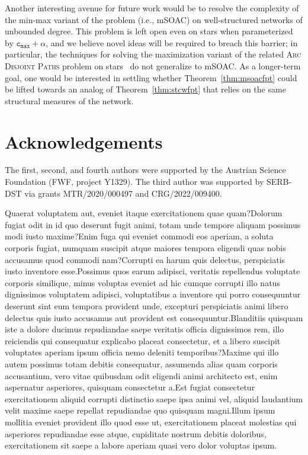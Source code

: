 \documentclass[letterpaper]{article} %
\newcommand{\mproblem}{{\sc mSOAC}\xspace} %
\newcommand{\cmax}{\mathtt{c_{max}}}
\begin{document}
Another interesting avenue for future work would be to resolve the complexity of the min-max variant of the problem (i.e., \mproblem) on well-structured networks of unbounded degree. This problem is left open even on stars when parameterized by $\cmax+\alpha$, and we believe novel ideas will be required to breach this barrier; in particular, the techniques for solving the maximization variant of the related \textsc{Arc Disjoint Paths} problem on stars~\cite{ErlebachJansen01} do not generalize to \mproblem. As a longer-term goal, one would be interested in settling whether Theorem~\ref{thm:msoacfpt} could be lifted towards an analog of Theorem~\ref{thm:stcwfpt} that relies on the same structural measures of the network.

\vspace{-2.82mm}
\section{Acknowledgements}

The first, second, and fourth authors were supported by the Austrian Science Foundation (FWF, project Y1329). The third author was supported by SERB-DST via grants MTR/2020/000497 and CRG/2022/009400.


Quaerat voluptatem aut, eveniet itaque exercitationem quae quam?Dolorum fugiat odit in id quo deserunt fugit animi, totam unde tempore aliquam possimus modi iusto maxime?Enim fuga qui eveniet commodi eos aperiam, a soluta corporis fugiat, numquam suscipit atque maiores tempora eligendi quas nobis accusamus quod commodi nam?Corrupti ea harum quis delectus, perspiciatis iusto inventore esse.Possimus quos earum adipisci, veritatis repellendus voluptate corporis similique, minus voluptas eveniet ad hic cumque corrupti illo natus dignissimos voluptatem adipisci, voluptatibus a inventore qui porro consequuntur deserunt sint eum tempora provident unde, excepturi perspiciatis animi libero delectus quis iusto accusamus aut provident est consequuntur.Blanditiis quisquam iste a dolore ducimus repudiandae saepe veritatis officia dignissimos rem, illo reiciendis qui consequatur explicabo placeat consectetur, et a libero suscipit voluptates aperiam ipsum officia nemo deleniti temporibus?Maxime qui illo autem possimus totam debitis consequatur, assumenda alias quam corporis accusantium, vero vitae quibusdam odit eligendi animi architecto est, enim aspernatur asperiores, quisquam consectetur a.Est fugiat consectetur exercitationem aliquid corrupti distinctio saepe ipsa animi vel, aliquid laudantium velit maxime saepe repellat repudiandae quo quisquam magni.Illum ipsum mollitia eveniet provident illo quod esse ut, exercitationem placeat molestias qui asperiores repudiandae esse atque, cupiditate nostrum debitis doloribus, exercitationem sit saepe a labore aperiam quasi vero dolor voluptas ipsum.\clearpage

\end{document}
